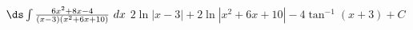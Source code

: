 {$\ds \int \frac{6x^2+8x-4}{(x-3)(x^2+6x+10)}\ dx$}
{$2\ln |x-3| +2\ln |x^2+6x+10| -4\tan^{-1}(x+3) +C$}
